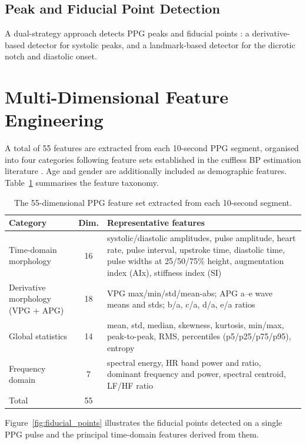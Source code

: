 \subsection{Peak and Fiducial Point Detection}

A dual-strategy approach detects PPG peaks and fiducial points \citep{pyppg2024}: a derivative-based detector for systolic peaks, and a landmark-based detector for the dicrotic notch and diastolic onset.

\section{Multi-Dimensional Feature Engineering}

A total of 55 features are extracted from each 10-second PPG segment, organised into four categories following feature sets established in the cuffless BP estimation literature \citep{elgendi2012,liang2018,slapnicar2019}. Age and gender are additionally included as demographic features. Table~\ref{tab:features} summarises the feature taxonomy.

\begin{table}[htbp]
\centering
\caption{The 55-dimensional PPG feature set extracted from each 10-second segment.}
\label{tab:features}
\small
\begin{tabular}{l c p{9.5cm}}
\toprule
Category & Dim. & Representative features \\
\midrule
Time-domain morphology & 16 & systolic/diastolic amplitudes, pulse amplitude, heart rate, pulse interval, upstroke time, diastolic time, pulse widths at 25/50/75\% height, augmentation index (AIx), stiffness index (SI) \\
Derivative morphology (VPG + APG) & 18 & VPG max/min/std/mean-abs; APG a--e wave means and stds; b/a, c/a, d/a, e/a ratios \\
Global statistics & 14 & mean, std, median, skewness, kurtosis, min/max, peak-to-peak, RMS, percentiles (p5/p25/p75/p95), entropy \\
Frequency domain & 7 & spectral energy, HR band power and ratio, dominant frequency and power, spectral centroid, LF/HF ratio \\
\midrule
Total & 55 & \\
\bottomrule
\end{tabular}
\end{table}

Figure~\ref{fig:fiducial_points} illustrates the fiducial points detected on a single PPG pulse and the principal time-domain features derived from them.

